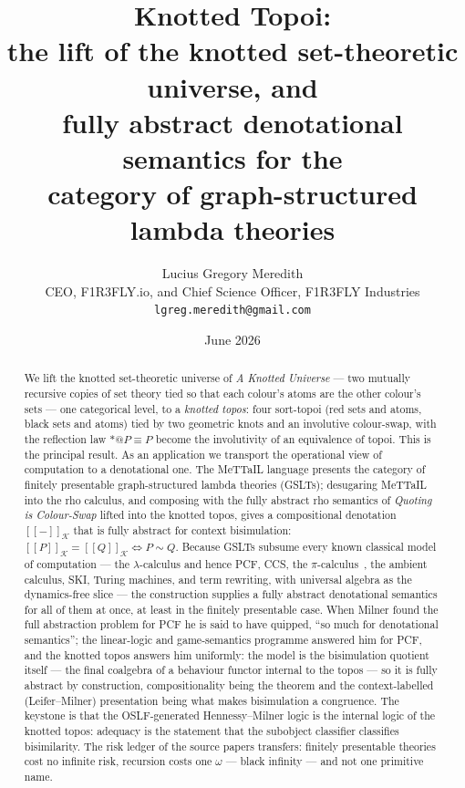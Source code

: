\documentclass[11pt]{article}
\title{Knotted Topoi:\\
the lift of the knotted set-theoretic universe, and\\
fully abstract denotational semantics for the\\
category of graph-structured lambda theories}
\author{Lucius Gregory Meredith\\
CEO, F1R3FLY.io, and Chief Science Officer, F1R3FLY Industries\\
\texttt{lgreg.meredith@gmail.com}}
\date{June 2026}
\makeatletter
\newcommand{\sem}[1]{[\![#1]\!]}
\newcommand{\Ks}{\mathcal{K}}
\newcommand{\quo}[1]{@#1}
\newcommand{\drf}[1]{{*}#1}
\theoremstyle{plain}
\theoremstyle{definition}
\theoremstyle{remark}
\makeatother
\begin{document}
\maketitle

\begin{abstract}
We lift the knotted set-theoretic universe of \emph{A Knotted Universe} --- two mutually recursive
copies of set theory tied so that each colour's atoms are the other colour's sets --- one
categorical level, to a \emph{knotted topos}: four sort-topoi (red sets and atoms, black sets and
atoms) tied by two geometric knots and an involutive colour-swap, with the reflection law
$\drf{}\quo{}P\equiv P$ become the involutivity of an equivalence of topoi. This is the principal
result. As an application we transport the operational view of computation to a denotational one.
The MeTTaIL language presents the category of finitely presentable graph-structured lambda theories
(GSLTs); desugaring MeTTaIL into the rho calculus, and composing with the fully abstract rho
semantics of \emph{Quoting is Colour-Swap} lifted into the knotted topos, gives a compositional
denotation $\sem{-}_{\Ks}$ that is fully abstract for context bisimulation:
$\sem{P}_{\Ks}=\sem{Q}_{\Ks}\iff P\sim Q$. Because GSLTs subsume every known classical model of
computation --- the $\lambda$-calculus and hence PCF, CCS, the $\pi$-calculus~\cite{sangiorgiwalker}, the ambient calculus,
SKI, Turing machines, and term rewriting, with universal algebra as the dynamics-free slice --- the
construction supplies a fully abstract denotational semantics for all of them at once, at least in
the finitely presentable case. When Milner found the full abstraction problem for PCF he is said to
have quipped, ``so much for denotational semantics''; the linear-logic and game-semantics programme
answered him for PCF, and the knotted topos answers him uniformly: the model is the bisimulation
quotient itself --- the final coalgebra of a behaviour functor internal to the topos --- so it is
fully abstract by construction, compositionality being the theorem and the context-labelled
(Leifer--Milner) presentation being what makes bisimulation a congruence. The keystone is that the
OSLF-generated Hennessy--Milner logic is the internal logic of the knotted topos: adequacy is the
statement that the subobject classifier classifies bisimilarity. The risk ledger of the source
papers transfers: finitely presentable theories cost no infinite risk, recursion costs one $\omega$
--- black infinity --- and not one primitive name.
\end{abstract}
\end{document}
